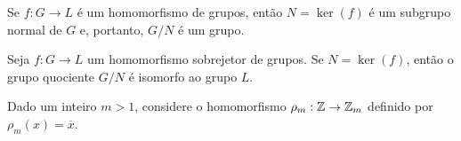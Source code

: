 \documentclass{beamer}
\begin{document}
    \begin{frame}
        \begin{lema}
            Se $f : G \to L$ é um homomorfismo de grupos, \pause então $N = \ker(f)$ \pause é um subgrupo normal de $G$ \pause e, portanto, $G/N$ é um grupo.
        \end{lema}
    \end{frame}

    \begin{frame}
        \begin{teorema}
            Seja $f : G \to L$ um homomorfismo sobrejetor \pause de grupos. \pause Se $N = \ker(f)$, \pause então o grupo quociente $G/N$ é isomorfo ao grupo $L$.
        \end{teorema}
    \end{frame}

    \begin{frame}
        \begin{exemplo}
            Dado um inteiro $m > 1$, \pause considere o homomorfismo $\rho_m : \mathbb{Z} \to \mathbb{Z}_m$ \pause definido por $\rho_m(x) = \overline{x}$.
        \end{exemplo}
    \end{frame}
    
\end{document}

